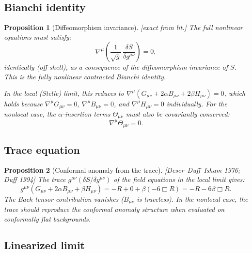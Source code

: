 \documentclass[12pt,a4paper]{article}
\newtheorem{proposition}{Proposition}[section]
\theoremstyle{definition}
\theoremstyle{remark}
\newcommand{\fromlit}[1]{\textcolor{blue!70!black}{\textsf{[#1]}}}
\newcommand{\exactlit}{\textcolor{blue!60!black}{\textsf{[exact from lit.]}}}
\begin{document}
\subsection{Bianchi identity}

\begin{proposition}[Diffeomorphism invariance]
\label{prop:bianchi-full}
\exactlit\;
The full nonlinear equations must satisfy:
\begin{equation}\label{eq:bianchi-full}
  \nabla^\mu\left(\frac{1}{\sqrt{g}}\,
  \frac{\delta S}{\delta g^{\mu\nu}}\right) = 0,
\end{equation}
identically (off-shell), as a consequence of the diffeomorphism
invariance of $S$.  This is the fully nonlinear contracted Bianchi
identity.

In the local (Stelle) limit, this reduces to
$\nabla^\mu(G_{\mu\nu} + 2\alpha B_{\mu\nu} + 2\beta H_{\mu\nu}) = 0$,
which holds because $\nabla^\mu G_{\mu\nu} = 0$,
$\nabla^\mu B_{\mu\nu} = 0$, and $\nabla^\mu H_{\mu\nu} = 0$
individually.  For the nonlocal case, the
$\alpha$-insertion terms $\Theta_{\mu\nu}$ must also be covariantly
conserved:
\begin{equation}
  \nabla^\mu\Theta_{\mu\nu} = 0.
\end{equation}
\end{proposition}

\subsection{Trace equation}

\begin{proposition}[Conformal anomaly from the trace]
\label{prop:trace}
\fromlit{Deser--Duff--Isham 1976; Duff 1994}
The trace $g^{\mu\nu}(\delta S/\delta g^{\mu\nu})$ of the field
equations in the local limit gives:
\begin{equation}\label{eq:trace-local}
  g^{\mu\nu}(G_{\mu\nu} + 2\alpha B_{\mu\nu} + \beta H_{\mu\nu})
  = -R + 0 + \beta(-6\Box R) = -R - 6\beta\Box R.
\end{equation}
The Bach tensor contribution vanishes ($B_{\mu\nu}$ is traceless).
In the nonlocal case, the trace should reproduce the conformal anomaly
structure when evaluated on conformally flat backgrounds.
\end{proposition}


\subsection{Linearized limit}
\end{document}
